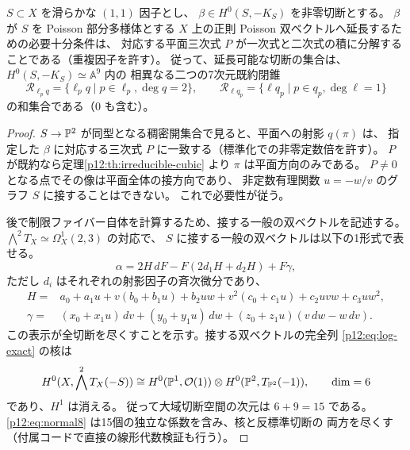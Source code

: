 \begin{theorem}\label{p12:th:fixed8}
$S\subset X$ を滑らかな $(1,1)$ 因子とし、
$\beta\in H^0(S,-K_S)$ を非零切断とする。
$\beta$ が $S$ を Poisson 部分多様体とする
$X$ 上の正則 Poisson 双ベクトルへ延長するための必要十分条件は、
対応する平面三次式 $P$ が一次式と二次式の積に分解することである（重複因子を許す）。
従って、延長可能な切断の集合は、$H^0(S,-K_S)\simeq\mathbb{A}^9$ 内の
相異なる二つの7次元既約閉錐
\[
 \mathcal R_{\ell_p q}=\{\ell_p q\mid p\in\ell_p,\deg q=2\},
 \qquad
 \mathcal R_{\ell q_p}=\{\ell q_p\mid p\in q_p,\deg \ell=1\}
\]
の和集合である（$0$ も含む）。
\end{theorem}
\begin{proof}
$S\to\mathbb P^2$ が同型となる稠密開集合で見ると、平面への射影 $q(\pi)$ は、
指定した $\beta$ に対応する三次式 $P$ に一致する（標準化での非零定数倍を許す）。
$P$ が既約なら定理\ref{p12:th:irreducible-cubic} より $\pi$ は平面方向のみである。
$P\ne0$ となる点でその像は平面全体の接方向であり、
非定数有理関数 $u=-w/v$ のグラフ $S$ に接することはできない。
これで必要性が従う。

後で制限ファイバー自体を計算するため、接する一般の双ベクトルを記述する。
$\bigwedge^2T_X\simeq\Omega^1_X(2,3)$ の対応で、
$S$ に接する一般の双ベクトルは以下の1形式で表せる。
\begin{equation}\label{p12:eq:normal8}
 \alpha=2H\,dF-F(2d_1H+d_2H)+F\gamma,
\end{equation}
ただし $d_i$ はそれぞれの射影因子の斉次微分であり、
\begin{align*}
H={}&a_0+a_1u+v(b_0+b_1u)+b_2uw
+v^2(c_0+c_1u)+c_2uvw+c_3uw^2,\\
\gamma={}&(x_0+x_1u)\,dv+(y_0+y_1u)\,dw
+(z_0+z_1u)(v\,dw-w\,dv).
\end{align*}
この表示が全切断を尽くすことを示す。接する双ベクトルの完全列
\eqref{p12:eq:log-exact} の核は
\[
H^0(X,\bigwedge^2T_X(-S))
 \cong H^0(\mathbb P^1,\mathcal O(1))\otimes
 H^0(\mathbb P^2,T_{\mathbb P^2}(-1)),\qquad\dim=6
\]
であり、$H^1$ は消える。
従って大域切断空間の次元は $6+9=15$ である。
\eqref{p12:eq:normal8} は15個の独立な係数を含み、核と反標準切断の
両方を尽くす（付属コードで直接の線形代数検証も行う）。


\end{proof}
